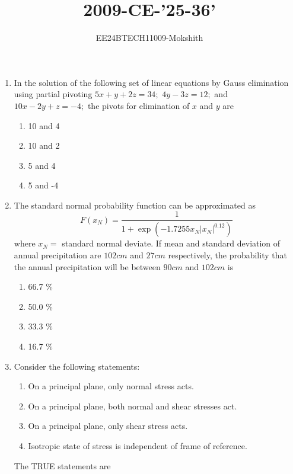 \documentclass[journal]{IEEEtran}
\begin{document}

\title{2009-CE-'25-36'}
\author{EE24BTECH11009-Mokshith}
{\let\newpage\relax\maketitle}
\renewcommand{\thefigure}{\theenumi}
\renewcommand{\thetable}{\theenumi}
\setlength{\intextsep}{10pt} %
\renewcommand{\thetable}{\theenumi
}
\begin{enumerate}[start=25]
\item In the solution of the following set of linear equations by Gauss elimination using partial pivoting
    $5x + y + 2z = 34;$ $4y - 3z = 12;$  and  $10x - 2y + z = -4;$
    the pivots for elimination of $x$ and $y$ are
\begin{enumerate}
    \item 10 and 4
    \item 10 and 2
    \item 5 and 4
    \item 5 and -4
\end{enumerate}
\item The standard normal probability function can be approximated as
$$F(x_N) = \frac{1}{1 + \exp(-1.7255 x_N |x_N|^{0.12})}$$
where $x_N =$ standard normal deviate. If mean and standard deviation of annual precipitation are $102 cm$ and $27 cm$ respectively, the probability that the annual precipitation will be between $90 cm$ and $102 cm$ is
\begin{enumerate}
    \item 66.7 \%
    \item 50.0 \%
    \item 33.3 \%
    \item 16.7 \%
\end{enumerate}
\item Consider the following statements:
\begin{enumerate}[label=\Roman{*}.]
    \item On a principal plane, only normal stress acts.
    \item On a principal plane, both normal and shear stresses act.
    \item On a principal plane, only shear stress acts.
    \item Isotropic state of stress is independent of frame of reference.
\end{enumerate}
The TRUE statements are
\begin{enumerate}

\end{enumerate}
\end{enumerate}
\end{document}
